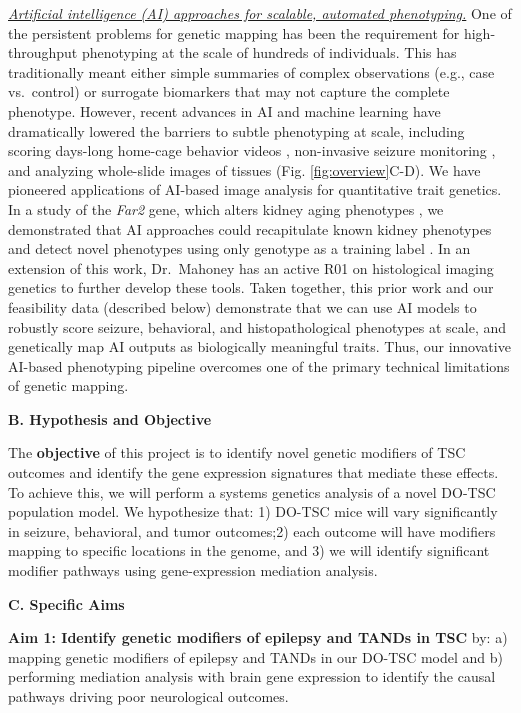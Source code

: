 \documentclass[
  12pt,
]{article}
\begin{document}
\textit{\underline{Artificial intelligence (AI) approaches for scalable, automated phenotyping.}}
One of the persistent problems for genetic mapping has been the
requirement for high-throughput phenotyping at the scale of hundreds of
individuals. This has traditionally meant either simple summaries of
complex observations (e.g., case vs.~control) or surrogate biomarkers
that may not capture the complete phenotype. However, recent advances in
AI and machine learning have dramatically lowered the barriers to subtle
phenotyping at scale, including scoring days-long home-cage behavior
videos
\cite{30127430, 26687221, 30573820, 31570119, 29779950, 37091193, 34718812, 35021077, 33729153},
non-invasive seizure monitoring \cite{36841241}, and analyzing
whole-slide images of tissues \cite{35202643, 31308507} (Fig.
\ref{fig:overview}C-D). We have pioneered applications of AI-based image
analysis for quantitative trait genetics. In a study of the
\textit{Far2} gene, which alters kidney aging phenotypes
\cite{29652635}, we demonstrated that AI approaches could recapitulate
known kidney phenotypes and detect novel phenotypes using only genotype
as a training label \cite{31220455}. In an extension of this work,
Dr.~Mahoney has an active R01 on histological imaging genetics to
further develop these tools. Taken together, this prior work and our
feasibility data (described below) demonstrate that we can use AI models
to robustly score seizure, behavioral, and histopathological phenotypes
at scale, and genetically map AI outputs as biologically meaningful
traits. Thus, our innovative AI-based phenotyping pipeline overcomes one
of the primary technical limitations of genetic mapping.

\textbf{B. Hypothesis and Objective}

The \textbf{objective} of this project is to identify novel genetic
modifiers of TSC outcomes and identify the gene expression signatures
that mediate these effects. To achieve this, we will perform a systems
genetics analysis of a novel DO-TSC population model. We hypothesize
that: 1) DO-TSC mice will vary significantly in seizure, behavioral, and
tumor outcomes;2) each outcome will have modifiers mapping to specific
locations in the genome, and 3) we will identify significant modifier
pathways using gene-expression mediation analysis.

\textbf{C. Specific Aims}

\textbf{Aim 1: Identify genetic modifiers of epilepsy and TANDs in TSC}
by: a) mapping genetic modifiers of epilepsy and TANDs in our DO-TSC
model and b) performing mediation analysis with brain gene expression to
identify the causal pathways driving poor neurological outcomes.
\end{document}
